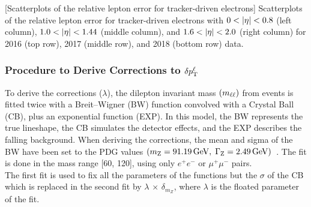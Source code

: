 \begin{multiFigure}
    \centering


        [Scatterplots of the relative lepton \PT error \vs \PT for tracker-driven electrons]
        {Scatterplots of the relative lepton \PT error \vs \PT for tracker-driven electrons with $0 < \lvert \eta \rvert < 0.8$ (left column), $1.0 < \lvert \eta \rvert < 1.44$ (middle column), and $1.6 < \lvert \eta \rvert < 2.0$ (right column) for 2016 (top row), 2017 (middle row), and 2018 (bottom row) data.}
    \label{fig:2D_Mpas_vs_pt_electron_tracker}
\end{multiFigure}

\subsubsection{Procedure to Derive Corrections to $\delta p_{\mathrm{T}}^{\ell}$}
To derive the corrections ($\lambda$), the dilepton invariant mass $\left( m_{\ell\ell} \right)$ from \ztolplm events is fitted twice with a Breit--Wigner (BW) function convolved with a Crystal Ball (CB), plus an exponential function (EXP).
In this model, the BW represents the true \mZ lineshape, the CB simulates the detector effects, and the EXP describes the falling background.
When deriving the corrections, the mean and sigma of the BW have been set to the PDG values $\left( m_{\text{Z}} = 91.19\,\text{Ge\hspace{-.08em}V}, \; \Gamma_{\text{Z}} = 2.49\,\text{Ge\hspace{-.08em}V} \right)$~\cite{particle_data_group_review_2020}.
 The fit is done in the mass range [60, 120]\GeV, using only
$e^{+}e^{-}$ or $\mu^{+}\mu^{-}$ pairs.\\
The first fit is used to fix all the parameters of the functions but the $\sigma$ of the CB which is
replaced in the second fit by $\lambda$ $\times$ $\delta_{m_{Z}}$, where $\lambda$ is the 
floated parameter of the fit. 

